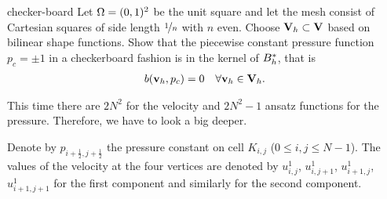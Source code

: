 \begin{Problem}{checker-board}
  Let $\Omega = (0,1)^2$ be the unit square and let the mesh consist
  of Cartesian squares of side length $\nicefrac1n$ with $n$
  even. Choose $\mathbf V_h \subset \mathbf V$ based on bilinear shape
  functions. Show that the piecewise constant pressure function
  $p_c=\pm 1$ in a checkerboard fashion is in the kernel of
  $B_h^*$, that is
  \begin{gather}
    b(\mathbf v_h, p_c) = 0 \quad\forall \mathbf v_h\in \mathbf V_h.
  \end{gather}
\begin{solution}
This time there are $2N^2$ for the velocity and $2N^2-1$ ansatz functions for
the pressure. Therefore, we have to look a big deeper.

Denote by $p_{i+\frac12, j+\frac12}$ the pressure constant on cell $K_{i,j}$
($0\leq i,j \leq N-1$). The values of the velocity at the four vertices are
denoted by $u^1_{i,j}$, $u^1_{i,j+1}$, $u^1_{i+1,j}$, $u^1_{i+1,j+1}$ for the
first component and similarly for the second component.


\end{solution}
\end{Problem}
